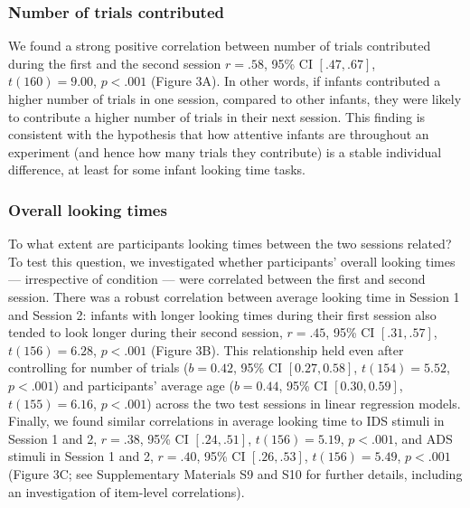 \documentclass[
  english,
  man,floatsintext]{apa6}
\begin{document}
\hypertarget{number-of-trials-contributed}{%
\subsubsection{Number of trials contributed}\label{number-of-trials-contributed}}

We found a strong positive correlation between number of trials contributed during the first and the second session \(r = .58\), 95\% CI \([.47, .67]\), \(t(160) = 9.00\), \(p < .001\) (Figure 3A).
In other words, if infants contributed a higher number of trials in one session, compared to other infants, they were likely to contribute a higher number of trials in their next session.
This finding is consistent with the hypothesis that how attentive infants are throughout an experiment (and hence how many trials they contribute) is a stable individual difference, at least for some infant looking time tasks.

\hypertarget{overall-looking-times}{%
\subsubsection{Overall looking times}\label{overall-looking-times}}

To what extent are participants looking times between the two sessions related?
To test this question, we investigated whether participants' overall looking times --- irrespective of condition --- were correlated between the first and second session.
There was a robust correlation between average looking time in Session 1 and Session 2: infants with longer looking times during their first session also tended to look longer during their second session, \(r = .45\), 95\% CI \([.31, .57]\), \(t(156) = 6.28\), \(p < .001\) (Figure 3B).
This relationship held even after controlling for number of trials (\(b = 0.42\), 95\% CI \([0.27, 0.58]\), \(t(154) = 5.52\), \(p < .001\)) and participants' average age (\(b = 0.44\), 95\% CI \([0.30, 0.59]\), \(t(155) = 6.16\), \(p < .001\)) across the two test sessions in linear regression models.
Finally, we found similar correlations in average looking time to IDS stimuli in Session 1 and 2, \(r = .38\), 95\% CI \([.24, .51]\), \(t(156) = 5.19\), \(p < .001\), and ADS stimuli in Session 1 and 2, \(r = .40\), 95\% CI \([.26, .53]\), \(t(156) = 5.49\), \(p < .001\) (Figure 3C; see Supplementary Materials S9 and S10 for further details, including an investigation of item-level correlations).
\end{document}

